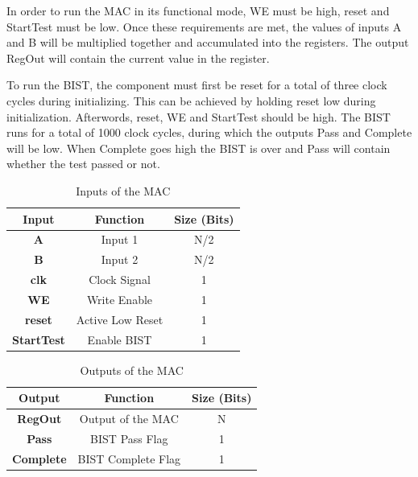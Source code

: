\documentclass[11pt]{article}
\begin{document}
		In order to run the MAC in its functional mode, WE must be high, reset and StartTest must be low. Once these requirements are met, the values of inputs A and B will be multiplied together and accumulated into the registers. The output RegOut will contain the current value in the register.
		
		To run the BIST, the component must first be reset for a total of three clock cycles during initializing. This can be achieved by holding reset low during initialization. Afterwords, reset, WE and StartTest should be high. The BIST runs for a total of 1000 clock cycles, during which the outputs Pass and Complete will be low. When Complete goes high the BIST is over and Pass will contain whether the test passed or not.
		
		\begin{table}[H]
			\centering
			\caption{Inputs of the MAC}
			\label{tab:Inputs}
			\begin{tabular}{|ccc|}
				\hline
				\textbf{}   \textbf{Input}      & \textbf{Function} &  \textbf{Size (Bits)} \\
				\hline
				\textbf{A}  & Input 1 & N/2          \\
				\textbf{B}  & Input 2 & N/2            \\ 
				\textbf{clk}  & Clock Signal & 1        \\ 
				\textbf{WE}  & Write Enable & 1           \\ 
				\textbf{reset}  & Active Low Reset & 1           \\ 
				\textbf{StartTest}  & Enable BIST & 1           \\ 
				\hline                     
			\end{tabular}
		\end{table}
		
		\begin{table}[H]
			\centering
			\caption{Outputs of the MAC}
			\label{tab:Outputs}
			\begin{tabular}{|ccc|}
				\hline
				\textbf{}   \textbf{Output}      & \textbf{Function} &  \textbf{Size (Bits)} \\
				\hline
				\textbf{RegOut}  & Output of the MAC & N          \\
				\textbf{Pass}  & BIST Pass Flag & 1            \\ 
				\textbf{Complete}  & BIST Complete Flag & 1        \\ 
				\hline                     
			\end{tabular}
		\end{table}
	
\end{document}

